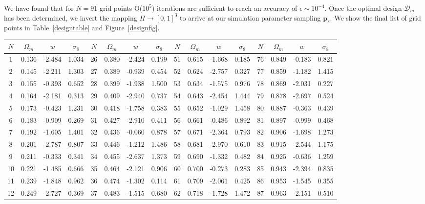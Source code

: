 \documentclass[reprint,aps,prd,superscriptaddress,showkeys,showpacs]{revtex4-1}
\begin{document}
We have found that for $N=91$ grid points O($10^5$) iterations are
sufficient to reach an accuracy of $\epsilon\sim10^{-4}$. Once the
optimal design $\mathcal{D}_m$ has been determined, we invert the
mapping $\Pi\rightarrow[0,1]^3$ to arrive at our simulation parameter
sampling $\mathbf{p}_s$. We show the final list of grid points in
Table~\ref{designtable} and Figure~\ref{designfig}.

\begin{table*}
\begin{tabular}{c|ccc||c|ccc||c|ccc||c|ccc}
$N$ & $\Omega_m$ & $w$ & $\sigma_8$ & $N$ & $\Omega_m$ & $w$ & $\sigma_8$ & $N$ & $\Omega_m$ & $w$ & $\sigma_8$ & $N$ & $\Omega_m$ & $w$ & $\sigma_8$ \\ \hline
1 & 0.136 & -2.484 & 1.034 & 26 & 0.380 & -2.424 & 0.199 & 51 & 0.615 & -1.668 & 0.185 & 76 & 0.849 & -0.183 & 0.821 \\
2 & 0.145 & -2.211 & 1.303 & 27 & 0.389 & -0.939 & 0.454 & 52 & 0.624 & -2.757 & 0.327 & 77 & 0.859 & -1.182 & 1.415 \\
3 & 0.155 & -0.393 & 0.652 & 28 & 0.399 & -1.938 & 1.500 & 53 & 0.634 & -1.575 & 0.976 & 78 & 0.869 & -2.031 & 0.227 \\
4 & 0.164 & -2.181 & 0.313 & 29 & 0.409 & -2.940 & 0.737 & 54 & 0.643 & -2.454 & 1.444 & 79 & 0.878 & -2.697 & 0.524 \\
5 & 0.173 & -0.423 & 1.231 & 30 & 0.418 & -1.758 & 0.383 & 55 & 0.652 & -1.029 & 1.458 & 80 & 0.887 & -0.363 & 0.439 \\
6 & 0.183 & -0.909 & 0.269 & 31 & 0.427 & -2.910 & 0.411 & 56 & 0.661 & -0.486 & 0.892 & 81 & 0.897 & -0.999 & 0.468 \\
7 & 0.192 & -1.605 & 1.401 & 32 & 0.436 & -0.060 & 0.878 & 57 & 0.671 & -2.364 & 0.793 & 82 & 0.906 & -1.698 & 1.273 \\
8 & 0.201 & -2.787 & 0.807 & 33 & 0.446 & -1.212 & 1.486 & 58 & 0.681 & -2.970 & 0.610 & 83 & 0.915 & -2.544 & 1.175 \\
9 & 0.211 & -0.333 & 0.341 & 34 & 0.455 & -2.637 & 1.373 & 59 & 0.690 & -1.332 & 0.482 & 84 & 0.925 & -0.636 & 1.259 \\
10 & 0.221 & -1.485 & 0.666 & 35 & 0.464 & -2.121 & 0.906 & 60 & 0.700 & -0.273 & 0.283 & 85 & 0.943 & -2.394 & 0.835 \\
11 & 0.239 & -1.848 & 0.962 & 36 & 0.474 & -1.302 & 0.114 & 61 & 0.709 & -2.061 & 0.425 & 86 & 0.953 & -1.545 & 0.355 \\
12 & 0.249 & -2.727 & 0.369 & 37 & 0.483 & -1.515 & 0.680 & 62 & 0.718 & -1.728 & 1.472 & 87 & 0.963 & -2.151 & 0.510 \\

\end{tabular}
\end{table*}
\end{document}
